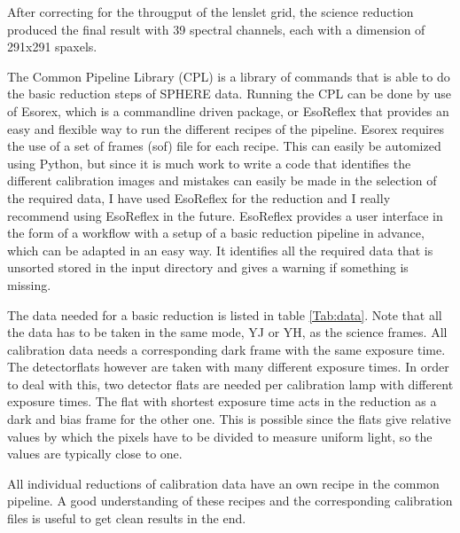 \documentclass[twoside,single]{lion-msc}
\begin{document}
After correcting for the througput of the lenslet grid, the science reduction produced the final result with 39 spectral channels, each with a dimension of 291x291 spaxels.
\bigskip

The Common Pipeline Library (CPL)\citep{Observatory2007} is a library of commands that is able to do the basic reduction steps of SPHERE data. Running the CPL can be done by use of Esorex, which is a commandline driven package, or EsoReflex that provides an easy and flexible way to run the different recipes of the pipeline. Esorex requires the use of a set of frames (sof) file for each recipe. This can easily be automized using Python, but since it is much work to write a code that identifies the different calibration images and mistakes can easily be made in the selection of the required data, I have used EsoReflex for the reduction and I really recommend using EsoReflex in the future. EsoReflex provides a user interface in the form of a workflow with a setup of a basic reduction pipeline in advance, which can be adapted in an easy way. It identifies all the required data that is unsorted stored in the input directory and gives a warning if something is missing. 
\bigskip

The data needed for a basic reduction is listed in table \ref{Tab:data}. Note that all the data has to be taken in the same mode, YJ or YH, as the science frames. All calibration data needs a corresponding dark frame with the same exposure time. The detectorflats however are taken with many different exposure times. In order to deal with this, two detector flats are needed per calibration lamp with different exposure times. The flat with shortest exposure time acts in the reduction as a dark and bias frame for the other one. This is possible since the flats give relative values by which the pixels have to be divided to measure uniform light, so the values are typically close to one. 
\bigskip

All individual reductions of calibration data have an own recipe in the common pipeline. A good understanding of these recipes and the corresponding calibration files is useful to get clean results in the end.
\end{document}
